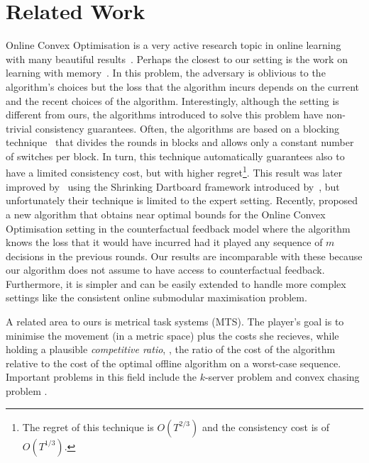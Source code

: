 \section{Related Work}
Online Convex Optimisation is a very active research topic in online learning with many beautiful results~\citep{DBLP:journals/tit/MerhavOSW02}. Perhaps the closest to our setting is the work on learning with memory~\citep{DBLP:journals/tit/MerhavOSW02}. 
In this problem, the adversary is oblivious to the algorithm's choices but the loss that the algorithm incurs depends on the current and the recent choices of the algorithm. 
Interestingly, although the setting is different from ours, the algorithms introduced to solve this problem have non-trivial consistency guarantees. Often, the algorithms  are based on a blocking technique~\citep{DBLP:journals/tit/MerhavOSW02} that divides the rounds in blocks and allows only a constant number of switches per block. 
In turn, this technique automatically guarantees also to have a limited consistency cost, but with higher regret\footnote{The regret of this technique is $O(T^{2/3})$ and the consistency cost is of $O(T^{1/3})$.}. 
This result was later improved by~\cite{DBLP:journals/tit/GyorgyN14} using the Shrinking Dartboard framework introduced by~\cite{DBLP:conf/colt/GeulenVW10}, but unfortunately their technique is limited to the expert setting. Recently, \cite{DBLP:conf/nips/AnavaHM15} proposed a new algorithm that obtains near optimal bounds for the Online Convex Optimisation setting in the counterfactual feedback model where the algorithm knows the loss that it would have incurred had it played any sequence of $m$ decisions in the previous rounds. 
Our results are incomparable with these because our algorithm does not assume to have access to counterfactual feedback. Furthermore, it is simpler and can be easily extended to handle more complex settings like the consistent online submodular maximisation problem.

A related area to ours is metrical task systems (MTS). The player's goal is to minimise the movement (in a metric space) plus the costs she recieves, while holding a plausible \emph{competitive ratio}, \ie, the ratio of the cost of the algorithm relative to the cost of the optimal offline algorithm on a worst-case sequence. Important problems in this field include the $k$-server problem \citep{manasse1990competitive,bubeck2017} and convex chasing problem \citep{argue2019nearly}. 

